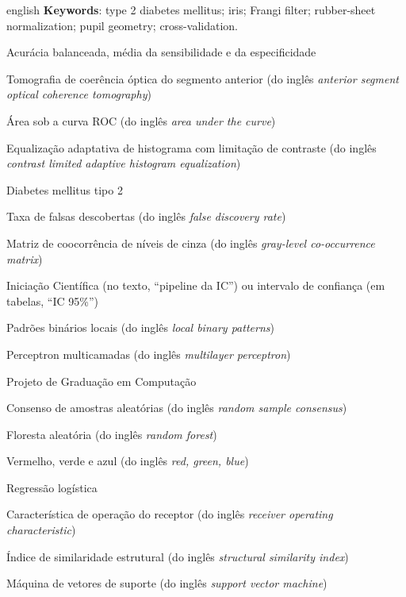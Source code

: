 \documentclass[12pt, oneside, a4paper, chapter=TITLE, section=TITLE,
               english, brazil]{abntex2}
\newcommand{\listofquadrosname}{Lista de quadros}
\theoremstyle{plain}
\theoremstyle{definition}
\begin{document}
\begin{resumo}[Abstract]
\begin{otherlanguage*}{english}
\vspace{\onelineskip}
\noindent\textbf{Keywords}: type 2 diabetes mellitus; iris; Frangi filter;
rubber-sheet normalization; pupil geometry; cross-validation.
\end{otherlanguage*}
\end{resumo}

\listoffigures*
\cleardoublepage

\pdfbookmark[0]{\listofquadrosname}{loq}
\listofquadros*
\cleardoublepage

\listoftables*
\cleardoublepage

\begin{siglas}
  \item[AB] Acurácia balanceada, média da sensibilidade e da especificidade
  \item[AS-OCT] Tomografia de coerência óptica do segmento anterior (do inglês
    \emph{anterior segment optical coherence tomography})
  \item[AUC] Área sob a curva ROC (do inglês \emph{area under the curve})
  \item[CLAHE] Equalização adaptativa de histograma com limitação de
    contraste (do inglês \emph{contrast limited adaptive histogram
    equalization})
  \item[DM2] Diabetes mellitus tipo 2
  \item[FDR] Taxa de falsas descobertas (do inglês \emph{false discovery rate})
  \item[GLCM] Matriz de coocorrência de níveis de cinza (do inglês
    \emph{gray-level co-occurrence matrix})
  \item[IC] Iniciação Científica (no texto, ``pipeline da IC'') ou intervalo
    de confiança (em tabelas, ``IC 95\%'')
  \item[LBP] Padrões binários locais (do inglês \emph{local binary patterns})
  \item[MLP] Perceptron multicamadas (do inglês \emph{multilayer perceptron})
  \item[PGC] Projeto de Graduação em Computação
  \item[RANSAC] Consenso de amostras aleatórias (do inglês \emph{random sample
    consensus})
  \item[RF] Floresta aleatória (do inglês \emph{random forest})
  \item[RGB] Vermelho, verde e azul (do inglês \emph{red, green, blue})
  \item[RL] Regressão logística
  \item[ROC] Característica de operação do receptor (do inglês
    \emph{receiver operating characteristic})
  \item[SSIM] Índice de similaridade estrutural (do inglês \emph{structural
    similarity index})
  \item[SVM] Máquina de vetores de suporte (do inglês \emph{support vector
    machine})
\end{siglas}
\end{document}
